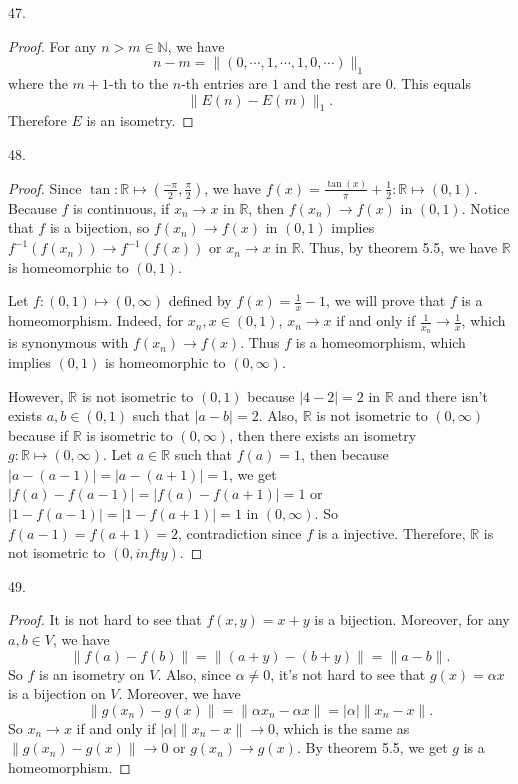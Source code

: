 \documentclass[12pt, a4paper]{article}
\theoremstyle{plain}
\newcommand{\N}{\mathbb{N}}
\newcommand{\R}{\mathbb{R}}
\begin{document}
47.
\begin{proof}
For any $n>m\in\N$, we have
\[
n-m=\|(0,\cdots,1,\cdots,1,0,\cdots)\|_1
\]
where the $m+1$-th to the $n$-th entries are $1$ and the rest are $0$. This equals
\[
\|E(n)-E(m)\|_1.
\]
Therefore $E$ is an isometry.
\end{proof}

48.
\begin{proof}
Since $\tan:\R\mapsto (\frac{-\pi}{2},\frac{\pi}{2})$, we have $f(x)=\frac{\tan(x)}{\pi}+\frac{1}{2}:\R\mapsto (0,1)$. Because $f$ is continuous, if $x_n\rightarrow x$ in $\R$, then $f(x_n)\rightarrow f(x)$ in $(0,1)$. Notice that $f$ is a bijection, so $f(x_n)\rightarrow f(x)$ in $(0,1)$ implies $f^{-1}(f(x_n))\rightarrow f^{-1}(f(x))$ or $x_n\rightarrow x$ in $\R$. Thus, by theorem 5.5, we have $\R$ is homeomorphic to $(0,1)$.

Let $f:(0,1)\mapsto (0,\infty)$ defined by $f(x)=\frac{1}{x}-1$, we will prove that $f$ is a homeomorphism. Indeed, for $x_n,x\in (0,1)$, $x_n\rightarrow x$ if and only if $\frac{1}{x_n}\rightarrow \frac{1}{x}$, which is synonymous with $f(x_n)\rightarrow f(x)$. Thus $f$ is a homeomorphism, which implies $(0,1)$ is homeomorphic to $(0,\infty)$.

However, $\R$ is not isometric to $(0,1)$ because $|4-2|=2$ in $\R$  and there isn't exists $a,b\in (0,1)$ such that $|a-b|=2$. Also, $\R$ is not isometric to $(0,\infty)$ because if $\R$ is isometric to $(0,\infty)$, then there exists an isometry $g:\R\mapsto (0,\infty)$. Let $a\in \R$ such that $f(a)=1$, then because $|a-(a-1)|=|a-(a+1)|=1$, we get $|f(a)-f(a-1)|=|f(a)-f(a+1)|=1$ or $|1-f(a-1)|=|1-f(a+1)|=1$ in $(0,\infty)$. So $f(a-1)=f(a+1)=2$, contradiction since $f$ is a injective. Therefore, $\R$ is not isometric to $(0,infty)$.
\end{proof}

49.
\begin{proof}
It is not hard to see that $f(x,y)=x+y$ is a bijection. Moreover, for any $a,b\in V$, we have
\[
\|f(a)-f(b)\|=\|(a+y)-(b+y)\|=\|a-b\|.
\]
So $f$ is an isometry on $V$. Also, since $\alpha\neq 0$, it's not hard to see that $g(x)=\alpha x$ is a bijection on $V$. Moreover, we have
\[
\|g(x_n)-g(x)\|=\|\alpha x_n-\alpha x\|=|\alpha|\|x_n-x\|.
\]
So $x_n\rightarrow x$ if and only if $|\alpha|\|x_n-x\|\rightarrow 0$, which is the same as $\|g(x_n)-g(x)\|\rightarrow 0$ or $g(x_n)\rightarrow g(x)$. By theorem 5.5, we get $g$ is a homeomorphism.
\end{proof}
\end{document}
